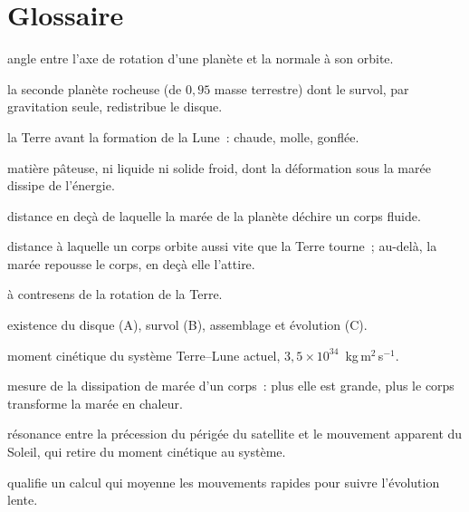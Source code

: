 \documentclass[11pt,a4paper]{article}
\newcommand{\LEM}{\ensuremath{L_{\rm EM}}}
\begin{document}
\section{Glossaire}

\begin{description}[leftmargin=3.2cm,style=nextline,itemsep=2pt]
\item[Obliquité] angle entre l'axe de rotation d'une planète et la normale à son orbite.
\item[Planète~$B$] la seconde planète rocheuse (de $0{,}95$ masse terrestre) dont le survol, par gravitation seule, redistribue le disque.
\item[Proto-Terre] la Terre avant la formation de la Lune~: chaude, molle, gonflée.
\item[Corps mou] matière pâteuse, ni liquide ni solide froid, dont la déformation sous la marée dissipe de l'énergie.
\item[Limite de Roche] distance en deçà de laquelle la marée de la planète déchire un corps fluide.
\item[Rayon de corotation] distance à laquelle un corps orbite aussi vite que la Terre tourne~; au-delà, la marée repousse le corps, en deçà elle l'attire.
\item[Rétrograde] à contresens de la rotation de la Terre.
\item[Phases A, B, C] existence du disque (A), survol (B), assemblage et évolution (C).
\item[$\LEM$] moment cinétique du système Terre--Lune actuel, $3{,}5\times10^{34}$~kg\,m$^2$\,s$^{-1}$.
\item[$k_2/Q$] mesure de la dissipation de marée d'un corps~: plus elle est grande, plus le corps transforme la marée en chaleur.
\item[Évection] résonance entre la précession du périgée du satellite et le mouvement apparent du Soleil, qui retire du moment cinétique au système.
\item[Séculaire] qualifie un calcul qui moyenne les mouvements rapides pour suivre l'évolution lente.
\end{description}



\end{document}
